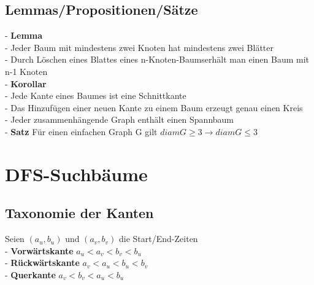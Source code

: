 \documentclass{article}
\begin{document}
\begin{multicols*}{3}
    \subsection{Lemmas/Propositionen/Sätze}
        - \textbf{Lemma}
            \\ - Jeder Baum mit mindestens zwei Knoten hat mindestens zwei Blätter
            \\ - Durch Löschen eines Blattes eines n-Knoten-Baumserhält man einen Baum mit n-1 Knoten
        \\- \textbf{Korollar}
            \\ - Jede Kante eines Baumes ist eine Schnittkante
            \\ - Das Hinzufügen einer neuen Kante zu einem Baum erzeugt genau einen Kreis
            \\ - Jeder zusammenhängende Graph enthält einen Spannbaum
        \\- \textbf{Satz} Für einen einfachen Graph G gilt $diam G \geq 3 \rightarrow diam G \leq 3$
\section{DFS-Suchbäume}
     \subsection{Taxonomie der Kanten}
        Seien $(a_u, b_u)$ und $(a_v, b_v)$ die Start/End-Zeiten
        \\- \textbf{Vorwärtskante} $a_u < a_v < b_v < b_u$
        \\- \textbf{Rückwärtskante} $a_v < a_u < b_u < b_v$
        \\- \textbf{Querkante} $a_v < b_v < a_u < b_u$

\end{multicols*}
\end{document}
